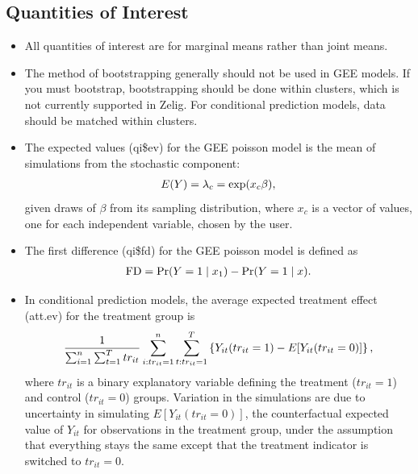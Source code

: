 \documentclass[letterpaper,10pt,english]{sphinxmanual}
\begin{document}
\subsection{Quantities of Interest}
\label{vignette:id146}\begin{itemize}
\item {} 
All quantities of interest are for marginal means rather than joint
means.

\item {} 
The method of bootstrapping generally should not be used in GEE
models. If you must bootstrap, bootstrapping should be done within
clusters, which is not currently supported in Zelig. For conditional
prediction models, data should be matched within clusters.

\item {} 
The expected values (qi\$ev) for the GEE poisson model is the mean of
simulations from the stochastic component:
\begin{gather}
\begin{split}E(Y) =
  \lambda_{c} = \mathrm{exp}(x_{c} \beta),\end{split}\notag
\end{gather}
given draws of \(\beta\) from its sampling distribution, where
\(x_{c}\) is a vector of values, one for each independent
variable, chosen by the user.

\item {} 
The first difference (qi\$fd) for the GEE poisson model is defined as
\begin{gather}
\begin{split}\textrm{FD} = \Pr(Y = 1 \mid x_1) - \Pr(Y = 1 \mid x).\end{split}\notag
\end{gather}
\item {} 
In conditional prediction models, the average expected treatment
effect (att.ev) for the treatment group is
\begin{gather}
\begin{split}\frac{1}{\sum_{i=1}^n \sum_{t=1}^T tr_{it}}\sum_{i:tr_{it}=1}^n \sum_{t:tr_{it}=1}^T \left\{ Y_{it}(tr_{it}=1) -
      E[Y_{it}(tr_{it}=0)] \right\},\end{split}\notag
\end{gather}
where \(tr_{it}\) is a binary explanatory variable defining the
treatment (\(tr_{it}=1\)) and control (\(tr_{it}=0\)) groups.
Variation in the simulations are due to uncertainty in simulating
\(E[Y_{it}(tr_{it}=0)]\), the counterfactual expected value of
\(Y_{it}\) for observations in the treatment group, under the
assumption that everything stays the same except that the treatment
indicator is switched to \(tr_{it}=0\).

\end{itemize}
\end{document}
